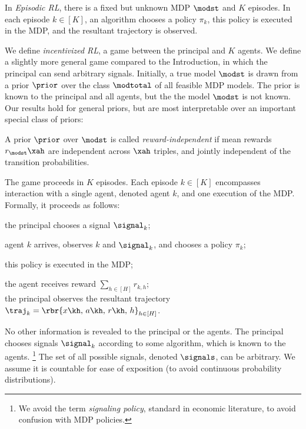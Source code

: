 
In \emph{Episodic RL}, there is a fixed but unknown MDP $\modst$ and $K$ episodes.
In each episode $k\in [K]$, an algorithm chooses a policy $\pi_k$, this policy is executed in the MDP, and the resultant trajectory is observed.

We define \emph{incentivized RL}, a game between the principal and $K$ agents. We define a slightly more general game compared to the Introduction, in which the principal can send arbitrary signals. Initially, a true model $\modst$ is drawn from a prior $\prior$ over the class $\modtotal$ of all feasible MDP models. The prior is known to the principal and all agents, but the the model $\modst$ is not known. Our results hold for general priors, but are most interpretable over an important special class of priors:
\begin{definition}\label{defn:reward_independence} A prior $\prior$ over $\modst$ is called \emph{reward-independent} if mean rewards $r_{\modst}\xah$ are independent across $\xah$ triples, and jointly independent of the transition probabilities.
\end{definition}

The game proceeds in $K$ episodes. Each episode $k\in[K]$ encompasses interaction with a single agent, denoted agent $k$, and one execution of the MDP. Formally, it proceeds as follows:
\begin{OneLiners}
\item[1.] the principal chooses a signal $\signal_k$;
\item[2.] agent $k$ arrives, observes $k$ and $\signal_k$, and chooses a policy $\pi_k$;
\item[3.] this policy is executed in the MDP;
\item[4.] the agent receives reward $\sum_{h\in[H]} r_{k,h}$; \\
the principal observes the resultant trajectory
    $\traj_k = \rbr{ x\kh,\, a\kh,\, r\kh,\, h }_{h\in[H]}$.
\end{OneLiners}
No other information is revealed to the principal or the agents. The principal chooses signals $\signal_k$ according to some algorithm, which is known to the agents.%
\footnote{ We avoid the term \emph{signaling policy}, standard in economic literature, to avoid confusion with MDP policies.}
The set of all possible signals, denoted $\signals$, can be arbitrary. We assume it is countable for ease of exposition (to avoid continuous probability distributions).

